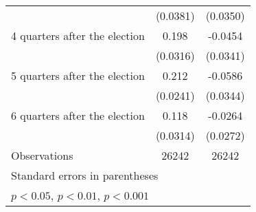 \begin{table}[htbp]
\begin{tabular}{l*{2}{c}}
                    &    (0.0381)         &    (0.0350)         \\
[1em]
 4 quarters after the election&       0.198\sym{***}&     -0.0454         \\
                    &    (0.0316)         &    (0.0341)         \\
[1em]
 5 quarters after the election&       0.212\sym{***}&     -0.0586         \\
                    &    (0.0241)         &    (0.0344)         \\
[1em]
 6 quarters after the election&       0.118\sym{***}&     -0.0264         \\
                    &    (0.0314)         &    (0.0272)         \\
\hline
Observations        &       26242         &       26242         \\
\hline\hline
\multicolumn{3}{l}{\footnotesize Standard errors in parentheses}\\
\multicolumn{3}{l}{\footnotesize \sym{*} \(p<0.05\), \sym{**} \(p<0.01\), \sym{***} \(p<0.001\)}\\
\end{tabular}
\end{table}
